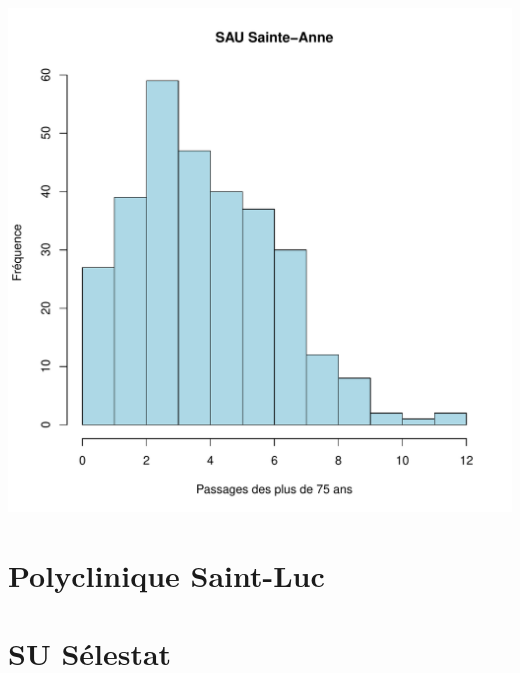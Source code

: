 \documentclass[12pt,english,french,twoside]{report}\usepackage[]{graphicx}\usepackage[]{color}
\makeatletter
\def\maxwidth{ %
  \ifdim\Gin@nat@width>\linewidth
    \linewidth
  \else
    \Gin@nat@width
  \fi
}
\newenvironment{knitrout}{}{} %
\makeatother
\begin{document}
\begin{knitrout}
\includegraphics[width=\maxwidth]{figure/stAnne_sup75_passages2} 

\end{knitrout}



\chapter{Polyclinique Saint-Luc}


\chapter{SU Sélestat}





\end{document}
